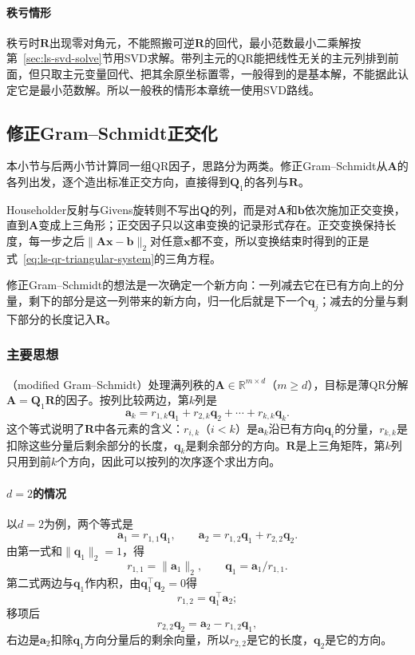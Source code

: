 \paragraph{秩亏情形}
秩亏时$\bm R$出现零对角元，不能照搬可逆$\bm R$的回代，最小范数最小二乘解按第~\ref{sec:ls-svd-solve}节用SVD求解。带列主元的QR能把线性无关的主元列排到前面，但只取主元变量回代、把其余原坐标置零，一般得到的是基本解，不能据此认定它是最小范数解。所以一般秩的情形本章统一使用SVD路线。

\subsection{修正Gram--Schmidt正交化}
\label{sec:ls-mgs}

本小节与后两小节计算同一组QR因子，思路分为两类。修正Gram--Schmidt从$\bm A$的各列出发，逐个造出标准正交方向，直接得到$\bm Q_1$的各列与$\bm R$。

Householder反射与Givens旋转则不写出$\bm Q$的列，而是对$\bm A$和$\bm b$依次施加正交变换，直到$\bm A$变成上三角形；正交因子只以这串变换的记录形式存在。正交变换保持长度，每一步之后$\lVert\bm A\bm x-\bm b\rVert_2$对任意$\bm x$都不变，所以变换结束时得到的正是式~\eqref{eq:ls-qr-triangular-system}的三角方程。

修正Gram--Schmidt的想法是一次确定一个新方向：一列减去它在已有方向上的分量，剩下的部分是这一列带来的新方向，归一化后就是下一个$\bm q_j$；减去的分量与剩下部分的长度记入$\bm R$。

\subsubsection{主要思想}
（modified Gram--Schmidt）处理满列秩的$\bm A\in\mathbb R^{m\times d}$（$m\geq d$），目标是薄QR分解$\bm A=\bm Q_1\bm R$的因子。按列比较两边，第$k$列是
\begin{equation}
 \bm a_k=r_{1,k}\bm q_1+r_{2,k}\bm q_2+\cdots+r_{k,k}\bm q_k .
 \label{eq:ls-mgs-column-expansion}
\end{equation}
这个等式说明了$\bm R$中各元素的含义：$r_{i,k}$（$i<k$）是$\bm a_k$沿已有方向$\bm q_i$的分量，$r_{k,k}$是扣除这些分量后剩余部分的长度，$\bm q_k$是剩余部分的方向。$\bm R$是上三角矩阵，第$k$列只用到前$k$个方向，因此可以按列的次序逐个求出方向。

\paragraph{$d=2$的情况}
以$d=2$为例，两个等式是
\[
 \bm a_1=r_{1,1}\bm q_1,\qquad \bm a_2=r_{1,2}\bm q_1+r_{2,2}\bm q_2 .
\]
由第一式和$\lVert\bm q_1\rVert_2=1$，得
\[
 r_{1,1}=\lVert\bm a_1\rVert_2,\qquad \bm q_1=\bm a_1/r_{1,1} .
\]
第二式两边与$\bm q_1$作内积，由$\bm q_1^\top\bm q_2=0$得
\[
 r_{1,2}=\bm q_1^\top\bm a_2 ;
\]
移项后
\[
 r_{2,2}\bm q_2=\bm a_2-r_{1,2}\bm q_1 ,
\]
右边是$\bm a_2$扣除$\bm q_1$方向分量后的剩余向量，所以$r_{2,2}$是它的长度，$\bm q_2$是它的方向。

